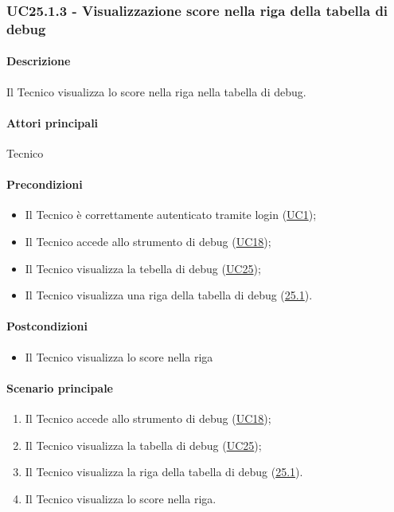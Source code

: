 
\subsubsection{UC25.1.3 - Visualizzazione score nella riga della tabella di debug}\label{UC25point1point3}
\paragraph*{Descrizione}
Il Tecnico visualizza lo score nella riga nella tabella di debug.

\paragraph*{Attori principali}
Tecnico

\paragraph*{Precondizioni}
\begin{itemize}
  \item Il Tecnico è correttamente autenticato tramite login (\hyperref[UC1]{UC1});
  \item Il Tecnico accede allo strumento di debug (\hyperref[UC18]{UC18});
  \item Il Tecnico visualizza la tebella di debug (\hyperref[UC25]{UC25});
  \item Il Tecnico visualizza una riga della tabella di debug (\hyperref[25point1]{25.1}).
\end{itemize}

\paragraph*{Postcondizioni}
\begin{itemize}
  \item Il Tecnico visualizza lo score nella riga
\end{itemize}

\paragraph*{Scenario principale}
\begin{enumerate}
  \item Il Tecnico accede allo strumento di debug (\hyperref[UC18]{UC18});
  \item Il Tecnico visualizza la tabella di debug (\hyperref[UC25]{UC25});
  \item Il Tecnico visualizza la riga della tabella di debug (\hyperref[UC25poin1]{25.1}).
  \item Il Tecnico visualizza lo score nella riga.
\end{enumerate}